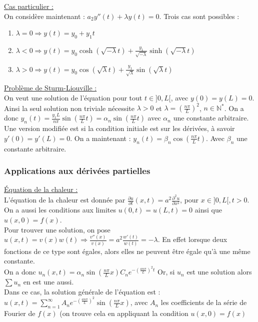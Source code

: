 \documentclass[../main.tex]{subfiles}
\begin{document}
\quad \underline{Cas particulier :}\\
On considère maintenant : $a_2 y''(t) + \lambda y(t) = 0$. Trois cas sont possibles :\\
\begin{enumerate}
    \item $\lambda = 0 \Rightarrow y(t) = y_0 + y_1t$\\
    \item $\lambda < 0 \Rightarrow y(t) = y_0 \cosh{(\sqrt{-\lambda}t)} + \frac{y_1}{\sqrt{-\lambda}} \sinh(\sqrt{-\lambda}t)$\\
    \item $\lambda>0 \Rightarrow y(t) = y_0 \cos(\sqrt{\lambda}t) + \frac{y_1}{\sqrt{\lambda}}\sin(\sqrt{\lambda}t)$\\
\end{enumerate}

\quad \underline{Problème de Sturm-Liouville :}\\
On veut une solution de l'équation pour tout $t\in ]0,L[$, avec $y(0)=y(L) = 0$. Ainsi la seul solution non triviale nécessite $\lambda > 0$ et $\lambda = (\frac{n\pi}{L})^2$, $n\in \mathbb{N}^*$. On a donc $y_n(t) = \frac{y_1L}{n\pi} \sin(\frac{n\pi}{L}t) = \alpha_n \sin(\frac{n\pi}{L}t)$ avec $\alpha_n$ une constante arbitraire.\\
Une version modifiée est si la condition initiale est sur les dérivées, à savoir $y'(0)=y'(L)=0$. On a maintenant : $y_n(t) = \beta_n \cos(\frac{n\pi}{L}t)$. Avec $\beta_n$ une constante arbitraire.\\

\subsubsection{Applications aux dérivées partielles}
\quad \underline{Équation de la chaleur :}\\
L'équation de la chaleur est donnée par $\frac{\partial u}{\partial t}(x,t) = a^2 \frac{\partial^2 u}{\partial x^2}$, pour $x\in ]0,L[, t>0$. On a aussi les conditions aux limites $u(0,t)=u(L,t) = 0$ ainsi que $u(x,0) = f(x)$. \\
Pour trouver une solution, on pose $u(x,t) = v(x)w(t) \Rightarrow \frac{v''(x)}{v(x)} = a^2 \frac{w'(t)}{w(t)} = -\lambda$. En effet lorsque deux fonctions de ce type sont égales, alors elles ne peuvent être égale qu'à une même constante.\\

On a donc $u_n(x,t) = \alpha_n \sin(\frac{n\pi}{L}x) C_ne^{-(\frac{an\pi}{L})^2t}$ Or, si $u_n$ est une solution alors $\sum u_n$ en est une aussi.\\
Dans ce cas, la solution générale de l'équation est : $u(x,t) = \sum_{n=1}^{\infty} A_n e^{-(\frac{an\pi}{L})^2} \sin(\frac{n\pi}{L}x)$, avec $A_n$ les coefficients de la série de Fourier de $f(x)$ (on trouve cela en appliquant la condition $u(x,0) = f(x)$\\
\end{document}

